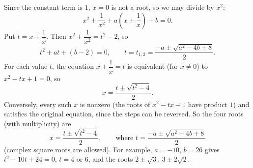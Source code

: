 Since the constant term is $1$, $x=0$ is not a root, so we may divide by $x^2$:
\[x^2+\dfrac1{x^2}+a\left(x+\dfrac1x\right)+b=0.\]
Put $t=x+\dfrac1x$. Then $x^2+\dfrac1{x^2}=t^2-2$, so
\[t^2+at+(b-2)=0,\qquad t=t_{1,2}=\dfrac{-a\pm\sqrt{a^2-4b+8}}{2}.\]
For each value $t$, the equation $x+\dfrac1x=t$ is equivalent (for $x\ne0$) to $x^2-tx+1=0$, so
\[x=\dfrac{t\pm\sqrt{t^2-4}}{2}.\]
Conversely, every such $x$ is nonzero (the roots of $x^2-tx+1$ have product $1$) and satisfies the original equation, since the steps can be reversed. So the four roots (with multiplicity) are
\[\boxed{x=\dfrac{t\pm\sqrt{t^2-4}}{2},\qquad\text{where }t=\dfrac{-a\pm\sqrt{a^2-4b+8}}{2}}\]
(complex square roots are allowed). For example, $a=-10$, $b=26$ gives $t^2-10t+24=0$, $t=4$ or $6$, and the roots $2\pm\sqrt3$, $3\pm2\sqrt2$.

